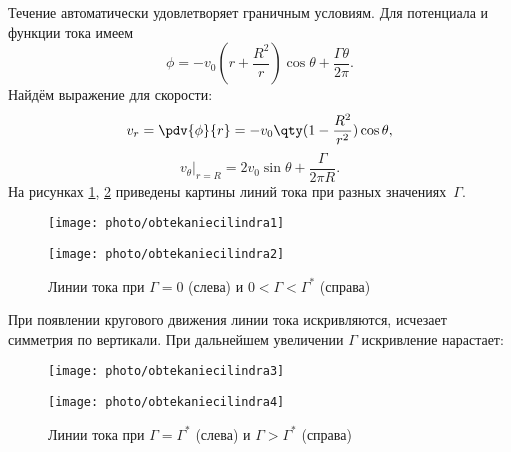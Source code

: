 Течение автоматически удовлетворяет граничным условиям. Для
потенциала и функции тока имеем
\begin{equation}
    \label{eq:qAr1aR}
    \phi = -v_0 \left( r+\frac{R^2}{r}\right)\cos\theta + \frac{\Gamma \theta}{2\pi}.
\end{equation}
Найдём выражение для скорости:
\begin{equation}
	v_r=\pdv{\phi}{r}=-v_0\qty(1-\frac{R^2}{r^2})\cos\theta,
\end{equation}
\begin{equation}
	v_\theta\big|_{r=R}=2v_0\sin\theta+\frac{\Gamma}{2\pi R}.
\end{equation}
На рисунках \ref{fig:lintok}, \ref{fig:lintok2} приведены картины линий тока при разных значениях~$\Gamma$.
\begin{figure}[H]
    \centering
    \noindent
	\begin{minipage}{.5\textwidth}
	\centering
	  \texttt{[image: photo/obtekaniecilindra1]}
	\end{minipage}%
	\begin{minipage}{.5\textwidth}
	\centering
	  \texttt{[image: photo/obtekaniecilindra2]}
	\end{minipage}

    \caption{Линии тока при $\Gamma=0$ (слева) и $0<\Gamma<\Gamma^*$ (справа)}
    \label{fig:lintok}
\end{figure}
При появлении кругового движения линии тока искривляются, исчезает симметрия по вертикали. При дальнейшем увеличении $\Gamma$ искривление нарастает:
\begin{figure}[H]
    \centering
    \noindent
	\begin{minipage}{.5\textwidth}
	\centering
	  \texttt{[image: photo/obtekaniecilindra3]}
	\end{minipage}%
	\begin{minipage}{.5\textwidth}
	\centering
	  \texttt{[image: photo/obtekaniecilindra4]}
	\end{minipage}

    \caption{Линии тока при $\Gamma=\Gamma^*$ (слева) и $\Gamma>\Gamma^*$ (справа)}
    \label{fig:lintok2}
\end{figure}

